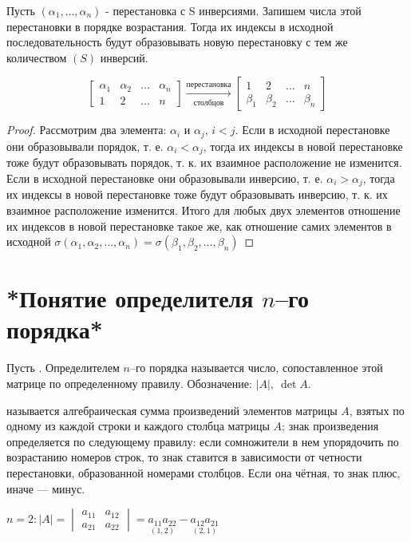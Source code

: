 \begin{lemma}
Пусть $(\alpha_1,\ldots,\alpha_n)$ - перестановка с S инверсиями. Запишем числа этой перестановки в порядке возрастания. Тогда их индексы в исходной последовательность будут образовывать новую перестановку с тем же количеством $(S)$ инверсий.
\end{lemma}
$$
\begin{bmatrix}
\alpha_1 & \alpha_2 & \ldots & \alpha_n \\
1        & 2        & \ldots & n
\end{bmatrix} \xrightarrow[\mbox{столбцов}]{\mbox{перестановка}}
\begin{bmatrix}
1       & 2       & \ldots & n       \\
\beta_1 & \beta_2 & \ldots & \beta_n
\end{bmatrix}
$$
\begin{proof}
Рассмотрим два элемента: $\alpha_i$ и $\alpha_j$, $i<j$. Если в исходной перестановке они образовывали порядок, т. е. $\alpha_i<\alpha_j$, тогда их индексы в новой перестановке тоже будут образовывать порядок, т. к. их взаимное расположение не изменится.
Если в исходной перестановке они образовывали инверсию, т. е. $\alpha_i>\alpha_j$, тогда их индексы в новой перестановке тоже будут образовывать инверсию, т. к. их взаимное расположение изменится.
Итого для любых двух элементов отношение их индексов в новой перестановке такое же, как отношение самих элементов в исходной \then $\sigma(\alpha_1,\alpha_2,\ldots,\alpha_n)=\sigma(\beta_1,\beta_2,\ldots,\beta_n)$
\end{proof}
\section{*Понятие определителя $n$--го порядка*}
Пусть . Определителем $n$--го порядка называется число, сопоставленное этой матрице по определенному правилу.
Обозначение: $|A|,\ \det A$.
\begin{opred}
 называется алгебраическая сумма произведений элементов матрицы $A$, взятых по одному из каждой строки и каждого столбца матрицы $A$; знак произведения определяется по следующему правилу: если сомножители в нем упорядочить по возрастанию номеров строк, то знак ставится в зависимости от четности перестановки, образованной номерами столбцов. Если она чётная, то знак плюс, иначе --- минус.
\end{opred}
$n=2: |A|=\begin{vmatrix} a_{11} & a_{12} \\ a_{21} & a_{22} \end{vmatrix}=\underset{(1,2)}{a_{11}a_{22}}-\underset{(2,1)}{a_{12}a_{21}}$

